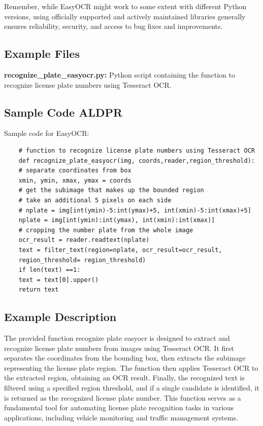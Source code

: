 Remember, while EasyOCR might work to some extent with different Python versions, using officially supported and actively maintained libraries generally ensures reliability, security, and access to bug fixes and improvements.

\subsection{Example Files}
\textbf{recognize\_plate\_easyocr.py:} Python script containing the function to recognize license plate numbers using Tesseract OCR.
\subsection{Sample Code ALDPR}
Sample code for EasyOCR:
\begin{lstlisting}
	# function to recognize license plate numbers using Tesseract OCR
	def recognize_plate_easyocr(img, coords,reader,region_threshold):
	# separate coordinates from box
	xmin, ymin, xmax, ymax = coords
	# get the subimage that makes up the bounded region
	# take an additional 5 pixels on each side
	# nplate = img[int(ymin)-5:int(ymax)+5, int(xmin)-5:int(xmax)+5]
	nplate = img[int(ymin):int(ymax), int(xmin):int(xmax)] 
	# cropping the number plate from the whole image
	ocr_result = reader.readtext(nplate)
	text = filter_text(region=nplate, ocr_result=ocr_result,
	region_threshold= region_threshold)
	if len(text) ==1:
	text = text[0].upper()
	return text
\end{lstlisting}
\subsection{Example Description}
The provided function recognize plate easyocr is designed to extract and recognize license plate numbers from images using Tesseract OCR. It first separates the coordinates from the bounding box, then extracts the subimage representing the license plate region. The function then applies Tesseract OCR to the extracted region, obtaining an OCR result. Finally, the recognized text is filtered using a specified region threshold, and if a single candidate is identified, it is returned as the recognized license plate number. This function serves as a fundamental tool for automating license plate recognition tasks in various applications, including vehicle monitoring and traffic management systems.\newline
